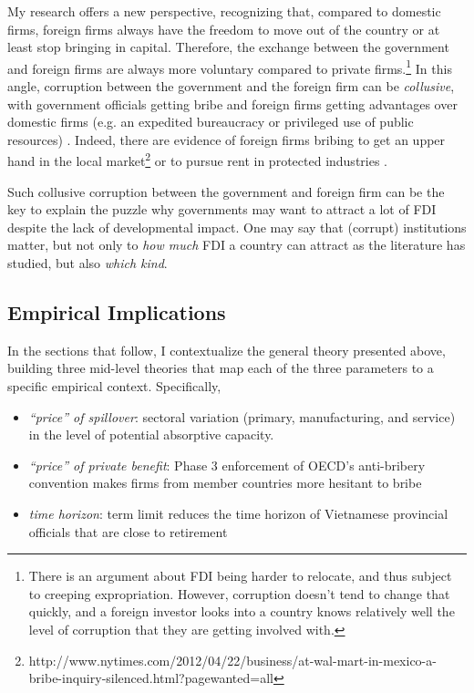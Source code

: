 My research offers a new perspective, recognizing that, compared to domestic firms, foreign firms always have the freedom to move out of the country or at least stop bringing in capital. Therefore, the exchange between the government and foreign firms are always more voluntary compared to private firms.\footnote{There is an argument about FDI being harder to relocate, and thus subject to creeping expropriation. However, corruption doesn't tend to change that quickly, and a foreign investor looks into a country knows relatively well the level of corruption that they are getting involved with.} In this angle, corruption between the government and the foreign firm can be \textit{collusive}, with government officials getting bribe and foreign firms getting advantages over domestic firms (e.g. an expedited bureaucracy or privileged use of public resources) \citep{Hellman2002}. Indeed, there are evidence of foreign firms bribing to get an upper hand in the local market\footnote{http://www.nytimes.com/2012/04/22/business/at-wal-mart-in-mexico-a-bribe-inquiry-silenced.html?pagewanted=all} or to pursue rent in protected industries \citep{Malesky2015}. 

Such collusive corruption between the government and foreign firm can be the key to explain the puzzle why governments may want to attract a lot of FDI despite the lack of developmental impact. One may say that (corrupt) institutions matter, but not only to \textit{how much} FDI a country can attract as the literature has studied, but also \textit{which kind}.


\subsection{Empirical Implications}

In the sections that follow, I contextualize the general theory presented above, building three mid-level theories that map each of the three parameters to a specific empirical context. Specifically,

\begin{itemize}
\item \textit{``price'' of spillover}: sectoral variation (primary, manufacturing, and service) in the level of potential absorptive capacity.

\item \textit{``price'' of private benefit}: Phase 3 enforcement of OECD's anti-bribery convention makes firms from member countries more hesitant to bribe

\item \textit{time horizon}: term limit reduces the time horizon of Vietnamese provincial officials that are close to retirement
\end{itemize}